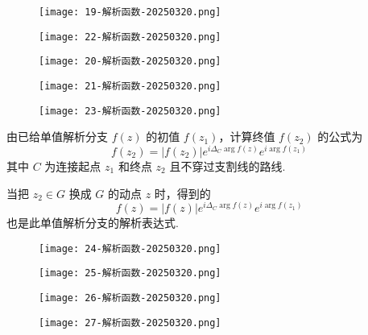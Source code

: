 \begin{figure}[H]
\centering
\texttt{[image: 19-解析函数-20250320.png]}
\label{}
\end{figure}

\begin{figure}[H]
\centering
\texttt{[image: 22-解析函数-20250320.png]}
\label{}
\end{figure}

\begin{figure}[H]
\centering
\texttt{[image: 20-解析函数-20250320.png]}
\label{}
\end{figure}

\begin{figure}[H]
\centering
\texttt{[image: 21-解析函数-20250320.png]}
\label{}
\end{figure}

\begin{figure}[H]
\centering
\texttt{[image: 23-解析函数-20250320.png]}
\label{}
\end{figure}

由已给单值解析分支 $f(z)$ 的初值 $f(z_1)$，计算终值 $f(z_2)$ 的公式为
\[
f(z_2)=\lvert f(z_2) \rvert e^{ i\Delta_{C}\arg f(z) }e^{ i\arg f(z_1) }
\]
其中 $C$ 为连接起点 $z_1$ 和终点 $z_2$ 且不穿过支割线的路线.

当把 $z_2\in G$ 换成 $G$ 的动点 $z$ 时，得到的
\[
f(z)=\lvert f(z) \rvert e^{ i\Delta_{C}\arg f(z) }e^{ i\arg f(z_1) }
\]
也是此单值解析分支的解析表达式.

\begin{exercise}
\begin{figure}[H]
\centering
\texttt{[image: 24-解析函数-20250320.png]}
\label{}
\end{figure}
\end{exercise}
\begin{figure}[H]
\centering
\texttt{[image: 25-解析函数-20250320.png]}
\label{}
\end{figure}

\begin{exercise}
\begin{figure}[H]
\centering
\texttt{[image: 26-解析函数-20250320.png]}
\label{}
\end{figure}
\end{exercise}
\begin{figure}[H]
\centering
\texttt{[image: 27-解析函数-20250320.png]}
\label{}
\end{figure}

